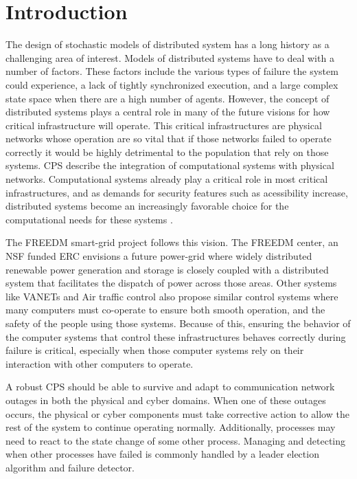 \chapter{Introduction}

The design of stochastic models of distributed system has a long history as a challenging area of interest.
Models of distributed systems have to deal with a number of factors.
These factors include the various types of failure the system could experience, a lack of tightly synchronized execution, and a large complex state space when there are a high number of agents\cite{DISTRIBUTED}\cite{distributed-challenges}. 
However, the concept of distributed systems plays a central role in many of the future visions for how critical infrastructure will operate.
This critical infrastructures are physical networks whose operation are so vital that if those networks failed to operate correctly it would be highly detrimental to the population that rely on those systems.
\ac{CPS} describe the integration of computational systems with physical networks.
Computational systems already play a critical role in most critical infrastructures, and as demands for security features such as acessibility increase, distributed systems become an increasingly favorable choice for the computational needs for these systems \cite{SMARTGRIDBENEFITS}.

The \ac{FREEDM}\cite{FREEDM} smart-grid project follows this vision. The \ac{FREEDM} center, an NSF funded ERC envisions a future power-grid where widely distributed renewable power generation and storage is closely coupled with a distributed system that facilitates the dispatch of power across those areas. Other systems like \ac{VANET}s\cite{CARS1}\cite{CARS2} and Air traffic control \cite{AIRTRAFFIC1}\cite{AIRTRAFFIC2} also propose similar control systems where many computers must co-operate to ensure both smooth operation, and the safety of the people using those systems. Because of this, ensuring the behavior of the computer systems that control these infrastructures behaves correctly during failure is critical, especially when those computer systems rely on their interaction with other computers to operate.

A robust \ac{CPS} should be able to survive and adapt to communication network outages in both the physical and cyber domains.
When one of these outages occurs, the physical or cyber components must take corrective action to allow the rest of the system to continue operating normally.
Additionally, processes may need to react to the state change of some other process.
Managing and detecting when other processes have failed is commonly handled by a leader election algorithm and failure detector.

